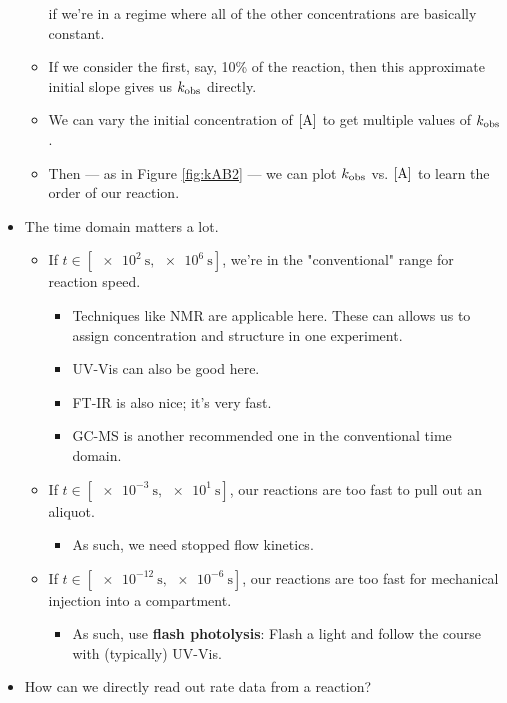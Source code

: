 \documentclass[../notes.tex]{subfiles}
\begin{document}
\begin{itemize}
\begin{itemize}
\begin{equation*}
        \end{equation*}
        if we're in a regime where all of the other concentrations are basically constant.
        \item If we consider the first, say, 10\% of the reaction, then this approximate initial slope gives us $k_\textup{obs}$ directly.
        \item We can vary the initial concentration of $\cnc{A}$ to get multiple values of $k_\textup{obs}$.
        \item Then --- as in Figure \ref{fig:kAB2} --- we can plot $k_\textup{obs}$ vs. $\cnc{A}$ to learn the order of our reaction.
    \end{itemize}
    \item The time domain matters a lot.
    \begin{itemize}
        \item If $t\in[\SI{e2}{\second},\SI{e6}{\second}]$, we're in the "conventional" range for reaction speed.
        \begin{itemize}
            \item Techniques like NMR are applicable here. These can allows us to assign concentration and structure in one experiment.
            \item UV-Vis can also be good here.
            \item FT-IR is also nice; it's very fast.
            \item GC-MS is another recommended one in the conventional time domain.
        \end{itemize}
        \item If $t\in[\SI{e-3}{\second},\SI{e1}{\second}]$, our reactions are too fast to pull out an aliquot.
        \begin{itemize}
            \item As such, we need stopped flow kinetics.
        \end{itemize}
        \item If $t\in[\SI{e-12}{\second},\SI{e-6}{\second}]$, our reactions are too fast for mechanical injection into a compartment.
        \begin{itemize}
            \item As such, use \textbf{flash photolysis}: Flash a light and follow the course with (typically) UV-Vis.
        \end{itemize}
    \end{itemize}
    \item How can we directly read out rate data from a reaction?
    \begin{itemize}

\end{itemize}
\end{itemize}
\end{document}
